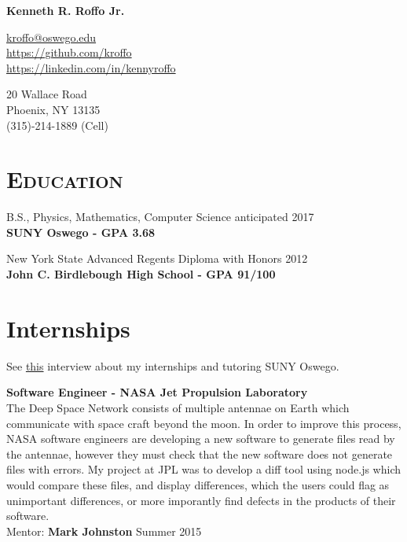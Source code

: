 \documentclass[8pt]{article}
\def\name{Kenneth R. Roffo Jr.}
\renewenvironment{itemize}{
  \begin{list}{}{
    \setlength{\leftmargin}{1.5em}
  }
}{
  \end{list}
}
\begin{document}
{\huge \bf \name}


\large \href{mailto:kroffo@oswego.edu}{kroffo@oswego.edu}\\
\href{https://github.com/kroffo}{https://github.com/kroffo}\\
\href{https://www.linkedin.com/in/kennyroffo}{https://linkedin.com/in/kennyroffo}\\

\vspace{0.15in}

20 Wallace Road \\
Phoenix, NY 13135 \\
(315)-214-1889 (Cell)


\section*{\textsc{Education}}

\begin{itemize}
  \item B.S., Physics, Mathematics, Computer Science \hfill anticipated 2017\\
  \textbf{SUNY Oswego - GPA 3.68}
  \item New York State Advanced Regents Diploma with Honors \hfill 2012\\
  \textbf{John C. Birdlebough High School - GPA 91/100}
  \end{itemize}	

\section*{Internships} See \href{https://www.youtube.com/watch?v=BiJOjhm_ov4}{this} interview about my internships and tutoring SUNY Oswego.
\begin{itemize}
\item \textbf{Software Engineer - NASA Jet Propulsion Laboratory}\\
  The Deep Space Network consists of multiple antennae on Earth which communicate with space craft beyond the moon. In order to improve this process, NASA software engineers are developing a new software to generate files read by the antennae, however they must check that the new software does not generate files with errors. My project at JPL was to develop a diff tool using node.js which would compare these files, and display differences, which the users could flag as unimportant differences, or more imporantly find defects in the products of their software.\\
  Mentor: \textbf{Mark Johnston} \hfill Summer 2015


\end{itemize}
\end{document}
